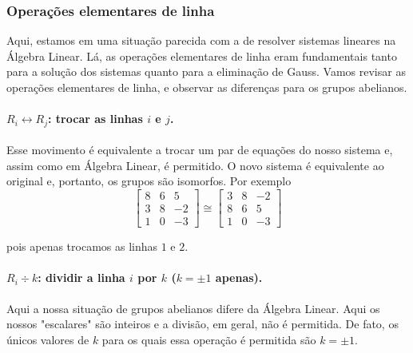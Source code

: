 	\subsubsection{Operações elementares de linha}
	\hspace{12pt} Aqui, estamos em uma situação parecida com a de resolver sistemas lineares na Álgebra Linear. Lá, as operações elementares de linha eram fundamentais tanto para a solução dos sistemas quanto para a eliminação de Gauss. Vamos revisar as operações elementares de linha, e observar as diferenças para os grupos abelianos.
	\paragraph{$R_i\leftrightarrow R_j$: trocar as linhas $i$ e $j$.} Esse movimento é equivalente a trocar um par de equações do nosso sistema e, assim como em Álgebra Linear, é permitido. O novo sistema é equivalente ao original e, portanto, os grupos são isomorfos. Por exemplo
	$$
	\begin{bmatrix}
	8 & 6 & 5 \\
	3 & 8 & -2 \\
	1 & 0 & -3
	\end{bmatrix}\cong\begin{bmatrix}
	3 & 8 & -2 \\
	8 & 6 & 5 \\
	1 & 0 & -3
	\end{bmatrix}
	$$
	\par\vspace{0.3cm} pois apenas trocamos as linhas $1$ e $2$.
	\paragraph{$R_i \div k$: dividir a linha $i$ por $k$ ($k=\pm1$ apenas).} Aqui a nossa situação de grupos abelianos difere da Álgebra Linear. Aqui os nossos "escalares" são inteiros e a divisão, em geral, não é permitida. De fato, os únicos valores de $k$ para os quais essa operação é permitida são $k=\pm1$.
	
